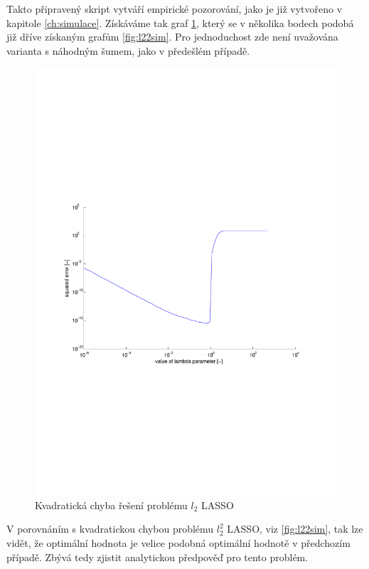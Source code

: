 \documentclass[FM,BP]{tulthesis}
\begin{document}
Takto připravený skript vytváří empirické pozorování, jako je již vytvořeno v kapitole \ref{ch:simulace}. Získáváme tak graf \ref{fig:l2}, který se v několika bodech podobá již dříve získaným grafům \ref{fig:l22sim}. Pro jednoduchost zde není uvažována varianta s náhodným šumem, jako v předešlém případě.

\begin{figure}[!ht]
	\begin{center}
		\includegraphics[scale=0.7]{obr/l2.pdf}
	\end{center}
	\caption{Kvadratická chyba řešení problému $l_2$ LASSO}
	\label{fig:l2}
\end{figure}

V porovnáním s kvadratickou chybou problému $l_{2}^{2}$ LASSO, viz \ref{fig:l22sim}, tak lze vidět, že optimální hodnota je velice podobná optimální hodnotě v předchozím případě. Zbývá tedy zjistit analytickou předpověď pro tento problém.
\end{document}
